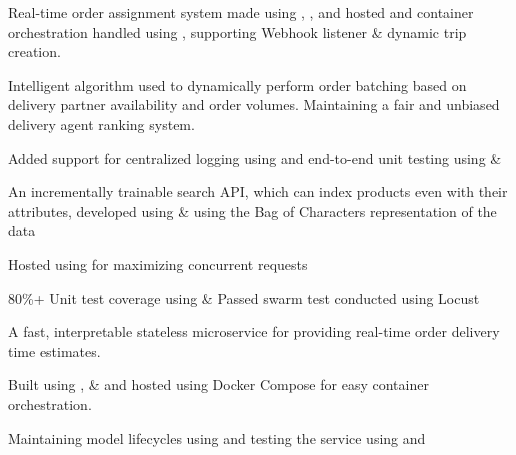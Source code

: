 \vspace{\topsep} %

\begin{tightemize}
\item Real-time order assignment system made using , , and hosted and container orchestration handled using , supporting Webhook listener \& dynamic trip creation.
\item Intelligent algorithm used to dynamically perform order batching based on delivery partner availability and order volumes. Maintaining a fair and unbiased delivery agent ranking system.
\item Added support for centralized logging using  and end-to-end unit testing using  \& 
\end{tightemize}

\begin{tightemize}
\item An incrementally trainable search API, which can index products even with their attributes, developed using  \&  using the Bag of Characters representation of the data
\item Hosted using  for maximizing concurrent requests
\item 80\%+ Unit test coverage using  \& Passed swarm test conducted using Locust
\end{tightemize}

\begin{tightemize}
\item A fast, interpretable stateless microservice for providing real-time order delivery time estimates.
\item Built using ,  \&  and hosted using Docker Compose for easy container orchestration.
\item Maintaining model lifecycles using  and testing the service using  and 
\end{tightemize}